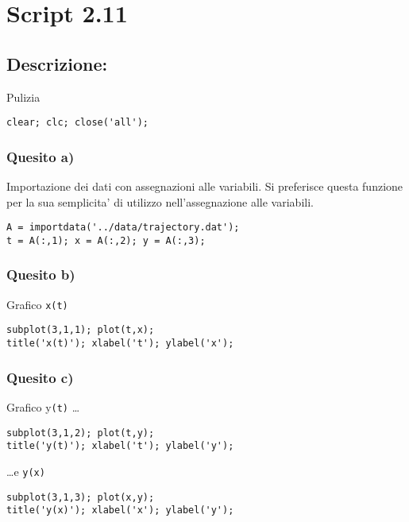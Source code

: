 \section{Script 2.11}\label{sec:script211}

\subsection{Descrizione:}
Pulizia
\begin{lstlisting}[firstnumber=1]
clear; clc; close('all');
\end{lstlisting}
\vspace{1em}

\subsubsection{Quesito a)}
Importazione dei dati con assegnazioni alle variabili. Si preferisce questa 
funzione per la sua semplicita' di utilizzo nell'assegnazione alle variabili.
\begin{lstlisting}[firstnumber=2]
A = importdata('../data/trajectory.dat');
t = A(:,1); x = A(:,2); y = A(:,3);
\end{lstlisting}
\vspace{1em}

\subsubsection{Quesito b)}
Grafico \texttt{x(t)}
\begin{lstlisting}[firstnumber=6]
subplot(3,1,1); plot(t,x);
title('x(t)'); xlabel('t'); ylabel('x');
\end{lstlisting}
\vspace{1em}

\subsubsection{Quesito c)}
Grafico y\texttt{(t)} \dots
\begin{lstlisting}[firstnumber=9]
subplot(3,1,2); plot(t,y);
title('y(t)'); xlabel('t'); ylabel('y');
\end{lstlisting}
\vspace{1em}

\dots e \texttt{y(x)}
\begin{lstlisting}[firstnumber=9]
subplot(3,1,3); plot(x,y);
title('y(x)'); xlabel('x'); ylabel('y');
\end{lstlisting}
\vspace{1em}

